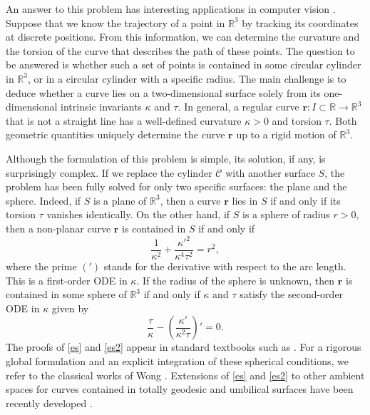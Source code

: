 \documentclass[a4paper,12pt]{amsart}
\theoremstyle{plain}
\theoremstyle{definition}
\newcommand{\bfr}{\mathbf{r}}
\def\cy{\mathcal C}
\def\r{\mathbb R}
\begin{document}
An answer to this problem has   interesting  applications  in computer vision  \cite{fo,ij,jt,krsw,kp}.   Suppose that we know  the  trajectory of a point in $\r^3$ by tracking its coordinates at discrete positions. From this information, we can determine   the curvature and the torsion of the curve that describes the path of these points. The question to be answered is whether such a set of  points is contained in  some circular cylinder in $\r^3$, or in a circular cylinder with a specific radius.  The main challenge is to deduce whether a curve lies on  a two-dimensional surface solely from  its one-dimensional  intrinsic invariants $\kappa$ and $\tau$. In general, a regular curve $\bfr\colon I\subset\r\to\r^3$ that is  not a straight line  has a well-defined   curvature $\kappa>0$ and   torsion $\tau$. Both geometric quantities  uniquely determine  the curve $\bfr$ up to a rigid motion of $\r^3$. 


Although the formulation of this problem is simple, its solution, if any,  is surprisingly complex.  
If we replace the cylinder $\cy$  with another surface $S$, the problem has been fully solved for only two specific surfaces: the plane and the  sphere. Indeed, if $S$ is a plane of $\r^3$, then a curve $\bfr$ lies   in $S$ if and only if its torsion $\tau$ vanishes identically. On the other hand, if $S$ is    a  sphere   of radius $r>0$, then   a non-planar curve $\bfr$ is contained in $S$ if and only if  
\begin{equation}\label{es}
\frac{1}{\kappa^2}+\frac{\kappa'^2}{\kappa^4\tau^2}=r^2,
\end{equation}
where the prime $(')$ stands for the derivative with respect to the arc length. This is a first-order ODE   in $\kappa$. If the radius of the sphere is unknown, then   $\bfr$ is  contained in some sphere of $\r^3$ if and only if $\kappa$ and $\tau$ satisfy the second-order ODE in $\kappa$ given by 
\begin{equation}\label{es2}
\frac{\tau}{\kappa}-\left(\frac{\kappa'}{\kappa^2\tau}\right)'=0.
\end{equation}
The proofs of \eqref{es} and \eqref{es2} appear in standard  textbooks such as \cite{dc,ku,st}.  For a rigorous global formulation and an explicit integration of these spherical conditions, we refer to the classical works of Wong \cite{wo1,wo2}. Extensions of \eqref{es} and \eqref{es2} to other ambient spaces   for curves contained in totally geodesic and umbilical surfaces have been recently developed    \cite{da,dd,lo1,pp,pm1}.
\end{document}
